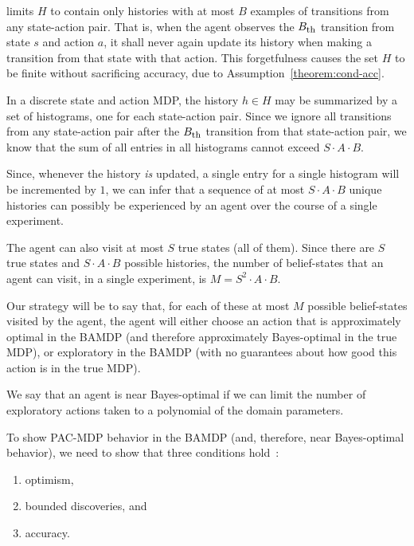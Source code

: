  limits $H$ to contain only histories with at most $B$ examples of transitions from any state-action pair. That is, when the agent observes the $B_{\mbox{\footnotesize{th}}}$ transition from state $s$ and action $a$, it shall never again update its history when making a transition from that state with that action. This forgetfulness causes the set $H$ to be finite without sacrificing accuracy, due to Assumption~\ref{theorem:cond-acc}.

In a discrete state and action MDP, the history $h\in H$ may be summarized by a set of histograms, one for each state-action pair. Since we ignore all transitions from any state-action pair after the $B_{\mbox{\footnotesize{th}}}$ transition from that state-action pair, we know that the sum of all entries in all histograms cannot exceed $S\cdot A \cdot B$.

Since, whenever the history \emph{is} updated, a single entry for a single histogram will be incremented by $1$, we can infer that a sequence of at most $S\cdot A \cdot B$ unique histories can possibly be experienced by an agent over the course of a single experiment.

The agent can also visit at most $S$ true states (all of them). Since there are $S$ true states and $S\cdot A \cdot B$ possible histories, the number of belief-states that an agent can visit, in a single experiment, is $M = S^2\cdot A \cdot B$.

Our strategy will be to say that, for each of these at most $M$ possible belief-states visited by the agent, the agent will either choose an action that is approximately optimal in the BAMDP (and therefore approximately Bayes-optimal in the true MDP), or exploratory in the BAMDP (with no guarantees about how good this action is in the true MDP).

We say that an agent is near Bayes-optimal if we can limit the number of exploratory actions taken to a polynomial of the domain parameters.

To show PAC-MDP behavior in the BAMDP (and, therefore, near Bayes-optimal behavior), we need to show that three conditions hold~\cite{lihong09pacmdp}:
\begin{enumerate}
\item \label{pacmdp-opt} optimism,
\item \label{pacmdp-disc} bounded discoveries, and
\item \label{pacmdp-acc} accuracy.
\end{enumerate}

